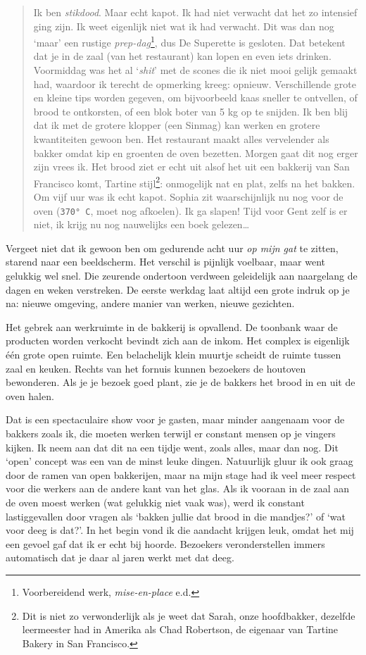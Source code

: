 \documentclass[
  11pt,
  dutch,
]{memoir}
\begin{document}
\begin{quote}
Ik ben \emph{stikdood}. Maar echt kapot. Ik had niet verwacht dat het zo
intensief ging zijn. Ik weet eigenlijk niet wat ik had verwacht. Dit was
dan nog `maar' een rustige \emph{prep-dag}\footnote{Voorbereidend werk,
  \emph{mise-en-place} e.d.}, dus De Superette is gesloten. Dat betekent
dat je in de zaal (van het restaurant) kan lopen en even iets drinken.
Voormiddag was het al `\emph{shit}' met de scones die ik niet mooi
gelijk gemaakt had, waardoor ik terecht de opmerking kreeg: opnieuw.
Verschillende grote en kleine tips worden gegeven, om bijvoorbeeld kaas
sneller te ontvellen, of brood te ontkorsten, of een blok boter van 5 kg
op te snijden. Ik ben blij dat ik met de grotere klopper (een Sinmag)
kan werken en grotere kwantiteiten gewoon ben. Het restaurant maakt
alles vervelender als bakker omdat kip en groenten de oven bezetten.
Morgen gaat dit nog erger zijn vrees ik. Het brood ziet er echt uit
alsof het uit een bakkerij van San Francisco komt, Tartine
stijl\footnote{Dit is niet zo verwonderlijk als je weet dat Sarah, onze
  hoofdbakker, dezelfde leermeester had in Amerika als Chad Robertson,
  de eigenaar van Tartine Bakery in San Francisco.}: onmogelijk nat en
plat, zelfs na het bakken. Om vijf uur was ik echt kapot. Sophia zit
waarschijnlijk nu nog voor de oven (\texttt{370°\ C}, moet nog
afkoelen). Ik ga slapen! Tijd voor Gent zelf is er niet, ik krijg nu nog
nauwelijks een boek gelezen\ldots{}
\end{quote}

Vergeet niet dat ik gewoon ben om gedurende acht uur \emph{op mijn gat}
te zitten, starend naar een beeldscherm. Het verschil is pijnlijk
voelbaar, maar went gelukkig wel snel. Die zeurende ondertoon verdween
geleidelijk aan naargelang de dagen en weken verstreken. De eerste
werkdag laat altijd een grote indruk op je na: nieuwe omgeving, andere
manier van werken, nieuwe gezichten.

Het gebrek aan werkruimte in de bakkerij is opvallend. De toonbank waar
de producten worden verkocht bevindt zich aan de inkom. Het complex is
eigenlijk één grote open ruimte. Een belachelijk klein muurtje scheidt
de ruimte tussen zaal en keuken. Rechts van het fornuis kunnen bezoekers
de houtoven bewonderen. Als je je bezoek goed plant, zie je de bakkers
het brood in en uit de oven halen.

Dat is een spectaculaire show voor je gasten, maar minder aangenaam voor
de bakkers zoals ik, die moeten werken terwijl er constant mensen op je
vingers kijken. Ik neem aan dat dit na een tijdje went, zoals alles,
maar dan nog. Dit `open' concept was een van de minst leuke dingen.
Natuurlijk gluur ik ook graag door de ramen van open bakkerijen, maar na
mijn stage had ik veel meer respect voor die werkers aan de andere kant
van het glas. Als ik vooraan in de zaal aan de oven moest werken (wat
gelukkig niet vaak was), werd ik constant lastiggevallen door vragen als
`bakken jullie dat brood in die mandjes?' of `wat voor deeg is dat?'. In
het begin vond ik die aandacht krijgen leuk, omdat het mij een gevoel
gaf dat ik er echt bij hoorde. Bezoekers veronderstellen immers
automatisch dat je daar al jaren werkt met dat deeg.
\end{document}
